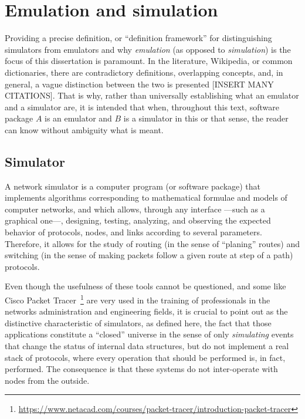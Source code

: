 
\chapter{Emulation and simulation}
\label{ch:emulsimvirt}

Providing a precise definition, or ``definition framework'' for distinguishing simulators from emulators and why \emph{emulation} (as opposed to \emph{simulation}) is the focus of this dissertation is paramount.
In the literature, Wikipedia, or common dictionaries, there are contradictory definitions, overlapping concepts, and, in general, a vague distinction between the two is presented [INSERT MANY CITATIONS]. %
That is why, rather than universally establishing what an emulator and a simulator are, it is intended that when, throughout this text, software package $A$ is an emulator and $B$ is a simulator in this or that sense, the reader can know without ambiguity what is meant.

\section{Simulator}
\label{sec:simulator}

A network simulator is a computer program (or software package) that implements algorithms corresponding to mathematical formulae and models of computer networks, and which allows, through any interface ---such as a graphical one---, designing, testing, analyzing, and observing the expected behavior of protocols, nodes, and links according to several parameters. Therefore, it allows for the study of routing (in the sense of ``planing'' routes) and switching (in the sense of making packets follow a given route at step of a path) protocols.

Even though the usefulness of these tools cannot be questioned, and some like Cisco Packet Tracer~\footnote{\url{https://www.netacad.com/courses/packet-tracer/introduction-packet-tracer}} are very used in the training of professionals in the networks administration and engineering fields, it is crucial to point out as the distinctive characteristic of simulators, as defined here, the fact that those applications constitute a ``closed'' universe in the sense of only \emph{simulating} events that change the status of internal data structures, but do not implement a real stack of protocols, where every operation that should be performed is, in fact, performed. %
The consequence is that these systems do not inter-operate with nodes from the outside.

